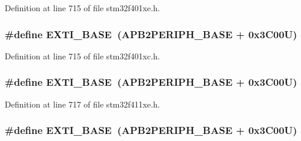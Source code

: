 Definition at line 715 of file stm32f401xe.\+h.

\subsubsection[{\texorpdfstring{E\+X\+T\+I\+\_\+\+B\+A\+SE}{EXTI_BASE}}]{\setlength{\rightskip}{0pt plus 5cm}\#define E\+X\+T\+I\+\_\+\+B\+A\+SE~({\bf A\+P\+B2\+P\+E\+R\+I\+P\+H\+\_\+\+B\+A\+SE} + 0x3\+C00\+U)}\hypertarget{group___peripheral__registers__structures_ga87371508b3bcdcd98cd1ec629be29061}{}\label{group___peripheral__registers__structures_ga87371508b3bcdcd98cd1ec629be29061}


Definition at line 715 of file stm32f401xc.\+h.

\subsubsection[{\texorpdfstring{E\+X\+T\+I\+\_\+\+B\+A\+SE}{EXTI_BASE}}]{\setlength{\rightskip}{0pt plus 5cm}\#define E\+X\+T\+I\+\_\+\+B\+A\+SE~({\bf A\+P\+B2\+P\+E\+R\+I\+P\+H\+\_\+\+B\+A\+SE} + 0x3\+C00\+U)}\hypertarget{group___peripheral__registers__structures_ga87371508b3bcdcd98cd1ec629be29061}{}\label{group___peripheral__registers__structures_ga87371508b3bcdcd98cd1ec629be29061}


Definition at line 717 of file stm32f411xe.\+h.

\subsubsection[{\texorpdfstring{E\+X\+T\+I\+\_\+\+B\+A\+SE}{EXTI_BASE}}]{\setlength{\rightskip}{0pt plus 5cm}\#define E\+X\+T\+I\+\_\+\+B\+A\+SE~({\bf A\+P\+B2\+P\+E\+R\+I\+P\+H\+\_\+\+B\+A\+SE} + 0x3\+C00\+U)}\hypertarget{group___peripheral__registers__structures_ga87371508b3bcdcd98cd1ec629be29061}{}\label{group___peripheral__registers__structures_ga87371508b3bcdcd98cd1ec629be29061}


